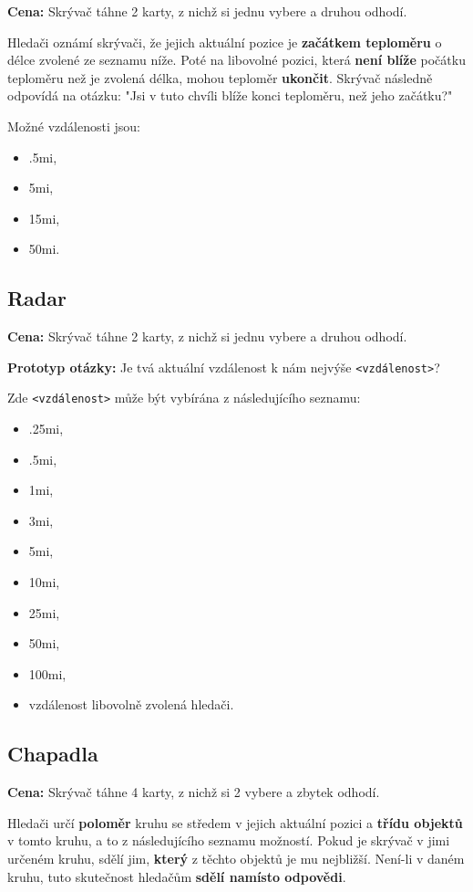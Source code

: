 \textbf{Cena:} Skrývač táhne 2 karty, z nichž si jednu vybere a druhou odhodí.

Hledači oznámí skrývači, že jejich aktuální pozice je \textbf{začátkem teploměru} o délce zvolené ze seznamu níže. Poté na libovolné pozici, která \textbf{není blíže} počátku teploměru než je zvolená délka, mohou teploměr \textbf{ukončit}. Skrývač následně odpovídá na otázku: "Jsi v tuto chvíli blíže konci teploměru, než jeho začátku?"

Možné vzdálenosti jsou:
\begin{itemize}
	\item \dist.5mi,
	\item \dist5mi,
	\item \dist15mi,
	\item \dist50mi.
\end{itemize}

\subsection{Radar}

\textbf{Cena:} Skrývač táhne 2 karty, z nichž si jednu vybere a druhou odhodí.

\textbf{Prototyp otázky:} Je tvá aktuální vzdálenost k nám nejvýše \verb|<vzdálenost>|?

Zde \verb|<vzdálenost>| může být vybírána z následujícího seznamu:
\begin{itemize}
	\item \dist.25mi,
	\item \dist.5mi,
	\item \dist1mi,
	\item \dist3mi,
	\item \dist5mi,
	\item \dist10mi,
	\item \dist25mi,
	\item \dist50mi,
	\item \dist100mi,
	\item vzdálenost libovolně zvolená hledači.
\end{itemize}

\subsection{Chapadla}

\textbf{Cena:} Skrývač táhne 4 karty, z nichž si 2 vybere a zbytek odhodí.

Hledači určí \textbf{poloměr} kruhu se středem v jejich aktuální pozici a \textbf{třídu objektů} v tomto kruhu, a to z následujícího seznamu možností. Pokud je skrývač v jimi určeném kruhu, sdělí jim, \textbf{který} z těchto objektů je mu nejbližší. Není-li v daném kruhu, tuto skutečnost hledačům \textbf{sdělí namísto odpovědi}.

